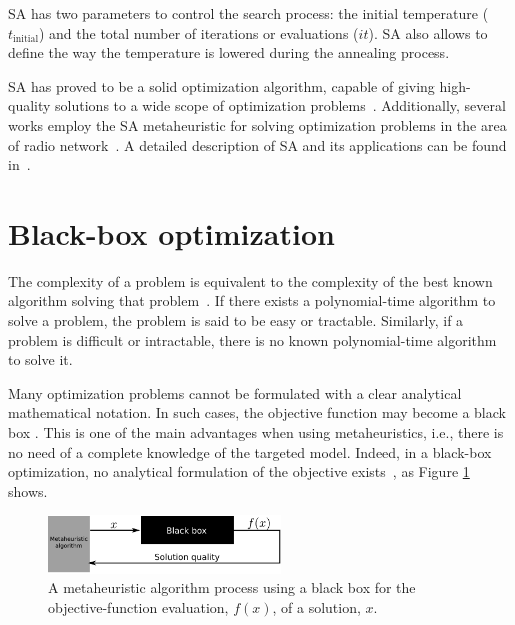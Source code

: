 SA has two parameters to control the search process: the initial temperature
($t_{\mathrm{initial}}$)
and the total number of iterations or evaluations ($it$).
SA also allows to define the way the temperature is lowered during
the annealing process.

SA has proved to be a solid optimization algorithm, capable of giving
high-quality solutions to a wide scope of optimization problems~\cite{Suman_SurveyOfSimulatedAnnealing}.
Additionally, several works employ the SA metaheuristic for solving
optimization problems in the area of radio network~\cite{Benedicic_Balancing_downlink_uplink_soft_handover_areas_in_UMTS_networks:2012,Duque-Channel_assignment_for_cellular_radio_using_simulated_annealing:1993,GarciaLozano_CPICHPowerOptimisationByMeansOfSimulatedAnnealingInAnUTRAFDDEnvironment,minimum.set.covering.problem:2000,Coverage.optimization.on.CPICH.tilt.and.azimuth:2006,Zhang-Mathematical_modelling_and_comparisons_of_heuristics_for_WCDMA_radio_planning:2006}.
A detailed description of SA and its applications can be found in~\cite{Van-Simulated_annealing:1987}.


\section{Black-box optimization \label{sub:02-Black_box_optimization}}

The complexity of a problem is equivalent to the complexity of the
best known algorithm solving that problem~\cite{Talbi_Metaheuristics:2009}.
If there exists a polynomial-time algorithm to solve a problem, the
problem is said to be easy or tractable. Similarly, if a problem is
difficult or intractable, there is no known polynomial-time algorithm
to solve it. 

Many optimization problems cannot be formulated with a clear analytical
mathematical notation. In such cases, the objective function may become
a black box \cite{Kargupta-Search_blackbox_optimization_and_sample_complexity:1996}.
This is one of the main advantages when using metaheuristics, i.e.,
there is no need of a complete knowledge of the targeted model. Indeed,
in a black-box optimization, no analytical formulation of the objective
exists~\cite{Talbi_Metaheuristics:2009}, as Figure \ref{fig:02-black_box_optimization}
shows.

\begin{figure}
\centering

\includegraphics[width=0.55\textwidth]{02-background_and_motivation/img/blackbox_optimization}

\caption{A metaheuristic algorithm process using a black box for the objective-function
evaluation, $f(x)$, of a solution, $x$. \label{fig:02-black_box_optimization}}
\end{figure}


